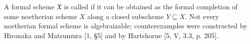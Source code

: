 A formal scheme $\mathfrak{X}$ is called  if it can be obtained as the formal completion of some noetherian scheme $X$ along a closed subscheme $Y \subseteq X$. Not every noetherian formal scheme is algebraizable; counterexamples were constructed by Hironaka and Matsumura [1, §5] and by Hartshorne [5, V, 3.3, p. 205].
